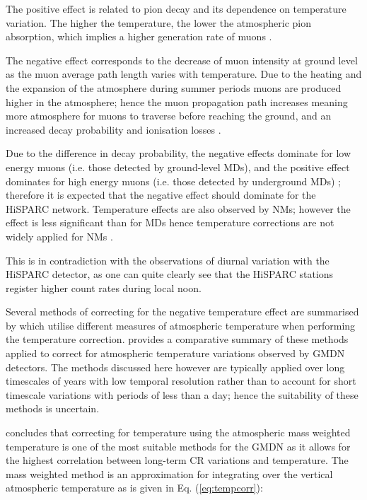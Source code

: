 The positive effect is related to pion decay and its dependence on temperature variation. The higher the temperature, the lower the atmospheric pion absorption, which implies a higher generation rate of muons \citep{mendoncca_temperature_2016}.

The negative effect corresponds to the decrease of muon intensity at ground level as the muon average path length varies with temperature. Due to the heating and the expansion of the atmosphere during summer periods muons are produced higher in the atmosphere; hence the muon propagation path increases meaning more atmosphere for muons to traverse before reaching the ground, and an increased decay probability and ionisation losses \citep{savic_pressure_2015, mendoncca_temperature_2016}.

Due to the difference in decay probability, the negative effects dominate for low energy muons (i.e. those detected by ground-level MDs), and the positive effect dominates for high energy muons (i.e. those detected by underground MDs) \citep{berkova_temperature_2011}; therefore it is expected that the negative effect should dominate for the HiSPARC network. Temperature effects are also observed by NMs; however the effect is less significant than for MDs hence temperature corrections are not widely applied for NMs \citep{mendoncca_temperature_2016}.

This is in contradiction with the observations of diurnal variation with the HiSPARC detector, as one can quite clearly see that the HiSPARC stations register higher count rates during local noon.

Several methods of correcting for the negative temperature effect are summarised by \cite{berkova_temperature_2011} which utilise different measures of atmospheric temperature when performing the temperature correction. \cite{mendoncca_temperature_2016} provides a comparative summary of these methods applied to correct for atmospheric temperature variations observed by GMDN detectors. The methods discussed here however are typically applied over long timescales of years with low temporal resolution rather than to account for short timescale variations with periods of less than a day; hence the suitability of these methods is uncertain.

\cite{mendoncca_temperature_2016} concludes that correcting for temperature using the atmospheric mass weighted temperature is one of the most suitable methods for the GMDN as it allows for the highest correlation between long-term CR variations and temperature. The mass weighted method is an approximation for integrating over the vertical atmospheric temperature as is given in Eq. (\ref{eq:tempcorr}):

